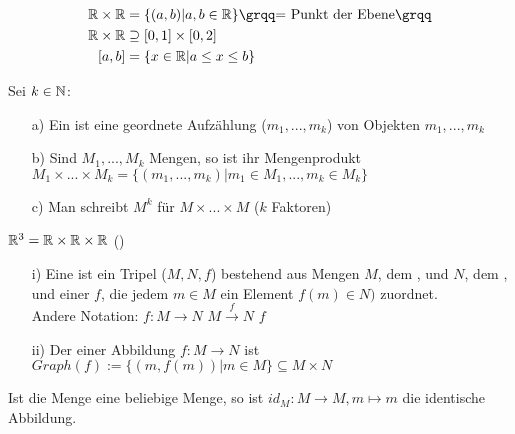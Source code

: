 \begin{bsp}
	\begin{align*}
	\RR\times\RR &=\{(a,b)|a,b\in\RR\} \text{\anf{= Punkt der Ebene}}\\
	\RR\times\RR &\supseteq [0,1]\times[0,2] \\
	[a,b] &=\{x\in\RR|a\leq x\leq b\}
	\end{align*}
\end{bsp}

\begin{defi}
	Sei $k\in\mathbb{N}$:
	\begin{itemize}
		\item[a)] Ein  ist eine geordnete Aufzählung ($m_{1},...,m_{k}$) von Objekten $m_{1},...,m_{k}$
		\item[b)] Sind $M_{1},...,M_{k}$ Mengen, so ist ihr Mengenprodukt $M_{1}\times...\times M_{k}=\{(m_{1},...,m_{k})|m_{1}\in M_{1},...,m_{k}\in M_{k}\}$
		\item[c)] Man schreibt $M^{k}$ für $M\times...\times M$ ($k$ Faktoren)
	\end{itemize}
\end{defi}

\begin{bsp}
	$\mathbb{R}^{3}=\mathbb{R}\times\mathbb{R}\times\mathbb{R}$ ()
\end{bsp}

\begin{defi}
	\begin{itemize}
		\item[]
		\item[i)] Eine  ist ein Tripel ($M,N,f$) bestehend aus Mengen $M$, dem , und $N$, dem , und einer  $f$, die jedem $m\in M$ ein Element $f(m)\in N)$ zuordnet. \\
		Andere Notation: $f:M\rightarrow N$ \hspace{3em} $M\xrightarrow{f} N$ \hspace{3em} $f$
		\item[ii)] Der  einer Abbildung $f:M\rightarrow N$ ist $Graph(f):=\{(m,f(m))|m\in M\}\subseteq M\times N$
	\end{itemize}
\end{defi}

\begin{bsp}
	Ist die Menge eine beliebige Menge, so ist $id_{M}:M\rightarrow M,m\mapsto m$ die identische Abbildung.
\end{bsp}

